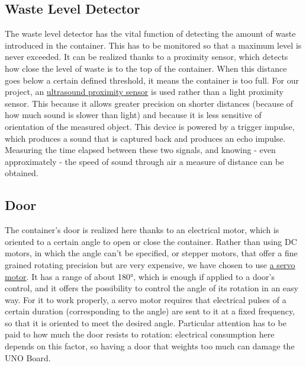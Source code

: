 \documentclass[a4paper,12pt]{report}
\begin{document}
	\subsection{Waste Level Detector}
	The waste level detector has the vital function of detecting the amount of waste introduced in the container. This has to be monitored so that a maximum level is never exceeded.\newline
	It can be realized thanks to a proximity sensor, which detects how close the level of waste is to the top of the container. When this distance goes below a certain defined threshold, it means the container is too full. For our project, an \href{https://docs.google.com/document/d/1Y-yZnNhMYy7rwhAgyL_pfa39RsB-x2qR4vP8saG73rE/edit?tab=t.0}{ultrasound proximity sensor} is used rather than a light proximity sensor. This because it allows greater precision on shorter distances (because of how much sound is slower than light) and because it is less sensitive of orientation of the measured object. This device is powered by a trigger impulse, which produces a sound that is captured back and produces an echo impulse. Measuring the time elapsed between these two signals, and knowing - even approximately - the speed of sound through air a measure of distance can be obtained.
	
	\subsection{Door}
	The container's door is realized here thanks to an electrical motor, which is oriented to a certain angle to open or close the container.\newline
	Rather than using DC motors, in which the angle can't be specified, or stepper motors, that offer a fine grained rotating precision but are very expensive, we have chosen to use \href{https://www.kjell.com/globalassets/mediaassets/701916_87897_datasheet_en.pdf?ref=4287817A7A}{a servo motor}. It has a range of about 180°, which is enough if applied to a door's control, and it offers the possibility to control the angle of its rotation in an easy way. For it to work properly, a servo motor requires that electrical pulses of a certain duration (corresponding to the angle) are sent to it at a fixed frequency, so that it is oriented to meet the desired angle. Particular attention has to be paid to how much the door resists to rotation: electrical consumption here depends on this factor, so having a door that weights too much can damage the UNO Board.
	
\end{document}
